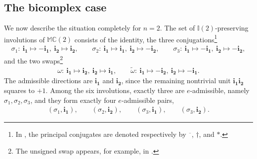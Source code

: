 \documentclass[12pt]{amsart}
\theoremstyle{plain}
\theoremstyle{definition}
\numberwithin{equation}{section}
\newcommand{\im}[1]{\mathbf{ i_{#1}}}
\newcommand{\mC}{\mathbb{C}}
\newcommand{\mM}{\mathbb{M}}
\newcommand{\mI}{\mathbb{I}}
\begin{document}
\subsection{The bicomplex case}\label{SS:Bicomplex}

We now describe the situation completely for $n = 2$. The set of $\mI(2)$-preserving involutions of $\mM \mC(2)$ consists of the identity, the three conjugations\footnote{In \cite{Bicomplex}, the principal conjugates are denoted respectively by $\overline{\phantom{z}}$, $\dagger$, and $\ast$.}
    \begin{align*}
    \sigma_1 : \ \im{1} \mapsto - \im{1} , \ \im{2} \mapsto \im{2} , \qquad
    \sigma_2 : \ \im{1} \mapsto \im{1} , \ \im{2} \mapsto - \im{2} , \qquad
    \sigma_3 : \ \im{1} \mapsto - \im{1} , \ \im{2} \mapsto - \im{2},
    \end{align*}
and the two swaps\footnote{The unsigned swap appears, for example, in \cite{PerezRegaladoQuiroga2018}.}
    \begin{align*}
    \omega : \ \im{1} \mapsto \im{2} , \ \im{2} \mapsto \im{1} , \qquad \widetilde{\omega} : \ \im{1} \mapsto -\im{2} , \ \im{2} \mapsto -\im{1}.
    \end{align*}
The admissible directions are $\im{1}$ and $\im{2}$, since the remaining nontrivial unit $\im{1}\im{2}$ squares to $+1$. Among the six involutions, exactly three are $e$-admissible, namely $\sigma_1, \sigma_2, \sigma_3$, and they form exactly four $e$-admissible pairs,
    \begin{align*}
    (\sigma_1 , \im{1}) , \qquad (\sigma_2 , \im{2}) , \qquad (\sigma_3 , \im{1}) , \qquad (\sigma_3 , \im{2}).
    \end{align*}
\end{document}
